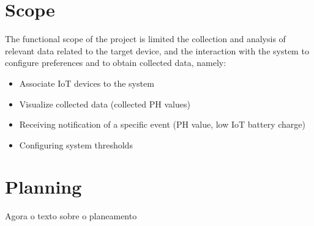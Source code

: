 \documentclass[a4paper,twoside,11pt]{article}
\begin{document}
\section*{Scope}
The functional scope of the project is limited the collection and analysis of relevant data related to the target device, and the interaction with the system to configure preferences and to obtain collected data, namely:
\begin{itemize}
  \item Associate IoT devices to the system
  \item Visualize collected data (collected PH values)
  \item Receiving notification of a specific event (PH value, low IoT battery charge)
  \item Configuring system thresholds
\end{itemize}

\section*{Planning}
Agora o texto sobre o planeamento



\end{document}
